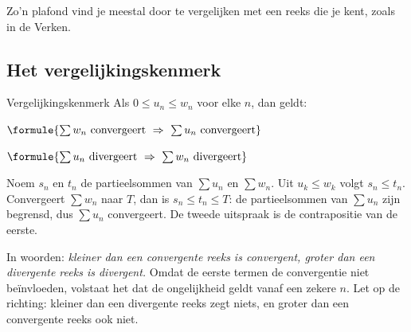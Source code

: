Zo'n plafond vind je meestal door te vergelijken met een reeks die je kent, zoals in de Verken.

\subsection{Het vergelijkingskenmerk}

\begin{theorie}
\begin{stelling}{Vergelijkingskenmerk}
Als $0 \leqslant u_n \leqslant w_n$ voor elke $n$, dan geldt:

\vspace{1mm}
\qquad $\formule{\sum w_n \text{ convergeert} \ \Rightarrow \ \sum u_n \text{ convergeert}}$

\vspace{1mm}
\qquad $\formule{\sum u_n \text{ divergeert} \ \Rightarrow \ \sum w_n \text{ divergeert}}$
\end{stelling}

\begin{bewijs}
Noem $s_n$ en $t_n$ de partieelsommen van $\sum u_n$ en $\sum w_n$. Uit $u_k \leqslant w_k$ volgt $s_n \leqslant t_n$. Convergeert $\sum w_n$ naar $T$, dan is $s_n \leqslant t_n \leqslant T$: de partieelsommen van $\sum u_n$ zijn begrensd, dus $\sum u_n$ convergeert. De tweede uitspraak is de contrapositie van de eerste.
\end{bewijs}
\end{theorie}

In woorden: \textit{kleiner dan een convergente reeks is convergent, groter dan een divergente reeks is divergent.} Omdat de eerste termen de convergentie niet beïnvloeden, volstaat het dat de ongelijkheid geldt vanaf een zekere $n$. Let op de richting: kleiner dan een divergente reeks zegt niets, en groter dan een convergente reeks ook niet.


